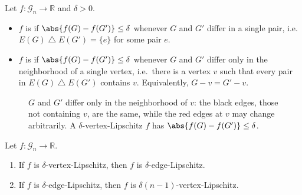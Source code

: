 \begin{definition}\label{def:lipschitz}
    Let \(f \colon \mathcal{G}_{n} \to \mathbb{R}\) and \(\delta > 0\).
    \begin{itemize}
        \item \(f\) is  if \(\abs{f(G) - f(G')} \le \delta\) whenever \(G\) and \(G'\) differ in a single pair, i.e.\ \(E(G) \mathbin{\triangle} E(G') = \{e\}\) for some pair \(e\).
        \item \(f\) is  if \(\abs{f(G) - f(G')} \le \delta\) whenever \(G\) and \(G'\) differ only in the neighborhood of a single vertex, i.e.\ there is a vertex \(v\) such that every pair in \(E(G) \mathbin{\triangle} E(G')\) contains \(v\). Equivalently, \(G - v = G' - v\).
    \end{itemize}
\end{definition}

\begin{figure}[H]
    \centering
    \caption{\(G\) and \(G'\) differ only in the neighborhood of \(v\): the black edges, those not containing \(v\), are the same, while the red edges at \(v\) may change arbitrarily. A \(\delta\)-vertex-Lipschitz \(f\) has \(\abs{f(G) - f(G')} \le \delta\).}
    \label{fig:vertex-lipschitz}
\end{figure}

\begin{observation}
    Let \(f \colon \mathcal{G}_{n} \to \mathbb{R}\).
    \begin{enumerate}[(1)]
        \item If \(f\) is \(\delta\)-vertex-Lipschitz, then \(f\) is \(\delta\)-edge-Lipschitz.
        \item If \(f\) is \(\delta\)-edge-Lipschitz, then \(f\) is \(\delta(n-1)\)-vertex-Lipschitz.
    \end{enumerate}
\end{observation}

